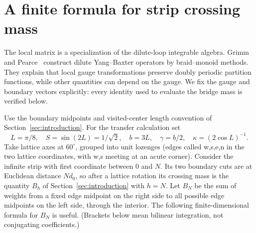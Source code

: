 \section{A finite formula for strip crossing mass}\label{c6:strip-transfer}

The local matrix is a specialization of the dilute-loop integrable algebra. Grimm and Pearce~\cite[Sections~4.1 and~4.6]{GrimmPearce1993} construct dilute Yang--Baxter operators by braid--monoid methods. They explain that local gauge transformations preserve doubly periodic partition functions, while other quantities can depend on the gauge. We fix the gauge and boundary vectors explicitly: every identity used to evaluate the bridge mass is verified below.


Use the boundary midpoints and visited-center length convention of Section~\ref{sec:introduction}. For the transfer calculation set
\[
 L=\pi/8,\quad S=\sin(2L)=1/\sqrt{2},\quad
 b=3L,\quad \gamma=b/2,\quad
 \kappa=(2\cos L)^{-1}.
\]
Take lattice axes at $60^\circ$, grouped into unit lozenges (edges called w,s,e,n in the two lattice coordinates, with w,s meeting at an acute corner). Consider the infinite strip with first coordinate between 0 and $N$. Its two boundary cuts are at Euclidean distance $Nd_0$, so after a lattice rotation its crossing mass is the quantity $B_h$ of Section~\ref{sec:introduction} with $h=N$. Let $B_N$ be the sum of weights from a fixed edge midpoint on the right side to all possible edge midpoints on the left side, through the interior. The following finite-dimensional formula for $B_N$ is useful. (Brackets below mean bilinear integration, not conjugating coefficients.)

